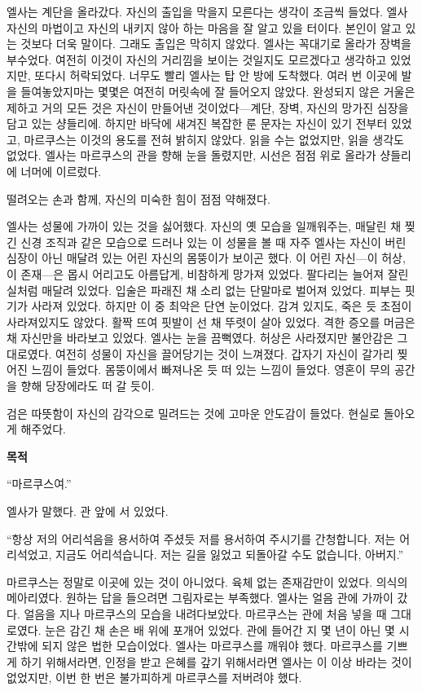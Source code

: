 엘사는 계단을 올라갔다. 자신의 출입을 막을지 모른다는 생각이 조금씩 들었다. 엘사 자신의 마법이고 자신의 내키지 않아 하는 마음을 잘 알고 있을 터이다. 본인이 알고 있는 것보다 더욱 말이다. 그래도 출입은 막히지 않았다. 엘사는 꼭대기로 올라가 장벽을 부수었다. 여전히 이것이 자신의 거리낌을 보이는 것일지도 모르겠다고 생각하고 있었지만, 또다시 허락되었다. 너무도 빨리 엘사는 탑 안 방에 도착했다. 여러 번 이곳에 발을 들여놓았지마는 몇몇은 여전히 머릿속에 잘 들어오지 않았다. 완성되지 않은 거울은 제하고 거의 모든 것은 자신이 만들어낸 것이었다—계단, 장벽, 자신의 망가진 심장을 담고 있는 샹들리에. 하지만 바닥에 새겨진 복잡한 룬 문자는 자신이 있기 전부터 있었고, 마르쿠스는 이것의 용도를 전혀 밝히지 않았다. 읽을 수는 없었지만, 읽을 생각도 없었다. 엘사는 마르쿠스의 관을 향해 눈을 돌렸지만, 시선은 점점 위로 올라가 샹들리에 너머에 이르렀다.

떨려오는 손과 함께, 자신의 미숙한 힘이 점점 약해졌다.

엘사는 성물에 가까이 있는 것을 싫어했다. 자신의 옛 모습을 일깨워주는, 매달린 채 찢긴 신경 조직과 같은 모습으로 드러나 있는 이 성물을 볼 때 자주 엘사는 자신이 버린 심장이 아닌 매달려 있는 어린 자신의 몸뚱이가 보이곤 했다. 이 어린 자신—이 허상, 이 존재—은 몹시 어리고도 아름답게, 비참하게 망가져 있었다. 팔다리는 늘어져 잘린 실처럼 매달려 있었다. 입술은 파래진 채 소리 없는 단말마로 벌어져 있었다. 피부는 핏기가 사라져 있었다. 하지만 이 중 최악은 단연 눈이었다. 감겨 있지도, 죽은 듯 초점이 사라져있지도 않았다. 활짝 뜨여 핏발이 선 채 뚜렷이 살아 있었다. 격한 증오를 머금은 채 자신만을 바라보고 있었다. 엘사는 눈을 끔뻑였다. 허상은 사라졌지만 불안감은 그대로였다. 여전히 성물이 자신을 끌어당기는 것이 느껴졌다. 갑자기 자신이 갈가리 찢어진 느낌이 들었다. 몸뚱이에서 빠져나온 듯 떠 있는 느낌이 들었다. 영혼이 무의 공간을 향해 당장에라도 떠 갈 듯이.

검은 따뜻함이 자신의 감각으로 밀려드는 것에 고마운 안도감이 들었다. 현실로 돌아오게 해주었다.

\textbf{목적}

``마르쿠스여.''

엘사가 말했다. 관 앞에 서 있었다.

``항상 저의 어리석음을 용서하여 주셨듯 저를 용서하여 주시기를 간청합니다. 저는 어리석었고, 지금도 어리석습니다. 저는 길을 잃었고 되돌아갈 수도 없습니다, 아버지.''

마르쿠스는 정말로 이곳에 있는 것이 아니었다. 육체 없는 존재감만이 있었다. 의식의 메아리였다. 원하는 답을 들으려면 그림자로는 부족했다. 엘사는 얼음 관에 가까이 갔다. 얼음을 지나 마르쿠스의 모습을 내려다보았다. 마르쿠스는 관에 처음 넣을 때 그대로였다. 눈은 감긴 채 손은 배 위에 포개어 있었다. 관에 들어간 지 몇 년이 아닌 몇 시간밖에 되지 않은 법한 모습이었다. 엘사는 마르쿠스를 깨워야 했다. 마르쿠스를 기쁘게 하기 위해서라면, 인정을 받고 은혜를 갚기 위해서라면 엘사는 이 이상 바라는 것이 없었지만, 이번 한 번은 불가피하게 마르쿠스를 저버려야 했다.

